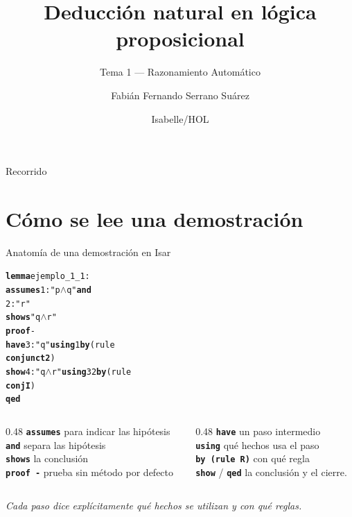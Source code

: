 \documentclass[11pt,aspectratio=169]{beamer}
\title{Deducción natural en lógica proposicional}
\subtitle{Tema 1 --- Razonamiento Automático}
\author{Fabián Fernando Serrano Suárez}
\institute{Ciencias de la Computación}
\date{Isabelle/HOL}
\newcommand{\sAnd}{\(\wedge\)}
\newcommand{\kw}[1]{\textcolor{isaCmd}{\textbf{#1}}}
\newcommand{\str}[1]{\textcolor{isaStr}{#1}}
\newcommand{\R}[1]{{\setlength{\fboxsep}{1pt}%
  \colorbox{resalte}{\ttfamily\bfseries\textcolor{granate}{#1}}}}
\newcommand{\nota}[1]{{\small\itshape\color{gray} #1}}
\begin{document}
\maketitle

\begin{frame}[t]{Recorrido}
  \vspace{0.5em}
  {\small\tableofcontents[pausesections]}
\end{frame}

\section{Cómo se lee una demostración}

\begin{frame}[fragile]{Anatomía de una demostración en Isar}
\begin{alltt}\footnotesize
\kw{lemma} ejemplo_1_1:
  \kw{assumes} 1: \str{"p \sAnd{} q"} \kw{and}
          2: \str{"r"}
  \kw{shows} \str{"q \sAnd{} r"}
\kw{proof} -
  \kw{have} 3: \str{"q"} \kw{using} 1 \kw{by} (rule \R{conjunct2})
  \kw{show} 4: \str{"q \sAnd{} r"} \kw{using} 3 2 \kw{by} (rule \R{conjI})
\kw{qed}
\end{alltt}
  \pause
  \vspace{-0.4em}
  \begin{columns}[t]
    \begin{column}{0.48\textwidth}
      \small
      \texttt{{\bf{assumes}}} \quad para indicar las hipótesis\\
      \texttt{{\bf{and}}} \quad separa las hipótesis\\
      \texttt{{\bf{shows}}} \quad la conclusión\\
      \texttt{{\bf{proof -}}} \quad prueba sin método por defecto
    \end{column}
    \begin{column}{0.48\textwidth}
      \small
      \texttt{{\bf{have}}} \quad un paso intermedio\\
      \texttt{{\bf{using}}} \quad qué hechos usa el paso\\
      \texttt{\bf{by (rule R)}} \quad con qué regla\\
      \texttt{{\bf{show}}} / \texttt{{\bf{qed}}} \quad la conclusión y el cierre.
    \end{column}
  \end{columns}
  \vspace{0.6em}
  \pause
  \nota{Cada paso dice explícitamente \alert{qué hechos se utilizan} y \alert{con qué reglas}.}
\end{frame}
\end{document}

